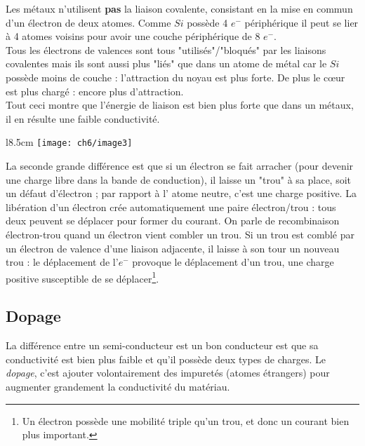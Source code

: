 	Les métaux n'utilisent \textbf{pas} la liaison covalente, consistant en la mise en 
	commun d'un électron de deux atomes. Comme $Si$ possède 4 $e^-$ périphérique 
	il peut se lier à 4 atomes voisins pour avoir une couche périphérique de 8 
	$e^-$.\\
	Tous les électrons de valences sont tous "utilisés"/"bloqués" par les liaisons 
	covalentes mais ils sont aussi plus "liés" que dans un atome de métal car 
	le $Si$ possède moins de couche : l'attraction du 	noyau est plus forte. De 
	plus le cœur est plus chargé : encore plus d'attraction.\\
	
	Tout ceci montre que l'énergie de liaison est bien plus forte que dans un 
	métaux, il en résulte une faible conductivité.\\
	
			\begin{wrapfigure}[12]{l}{8.5cm}
		\vspace{-0.5cm}
		\texttt{[image: ch6/image3]}
		\end{wrapfigure}	
	La seconde grande différence est que si un électron se fait arracher (pour 
	devenir une charge libre dans la bande de conduction), il 
	laisse un "trou" à sa place, soit un défaut d'électron ; par rapport à l'
	atome neutre, c'est une charge positive. La libération d'un électron 
	crée automatiquement une paire électron/trou : tous deux peuvent se 
	déplacer pour former du courant. On parle de recombinaison électron-trou 
	quand un électron vient combler un trou. Si un trou est comblé par un 
	électron de valence d'une liaison adjacente, il laisse à son tour un nouveau 
	trou : le déplacement de l'$e^-$ provoque le déplacement d'un trou, une 
	charge positive susceptible 	de se déplacer\footnote{Un électron possède 
	une mobilité triple qu'un trou, et donc un courant bien plus important.}.



	\subsection{Dopage}
	La différence entre un semi-conducteur est un bon conducteur est que sa 
	conductivité est bien plus faible et qu'il possède deux types de charges. 
	Le \textit{dopage}, c'est ajouter volontairement des impuretés (atomes 
	étrangers) pour augmenter grandement la conductivité du matériau.
		
